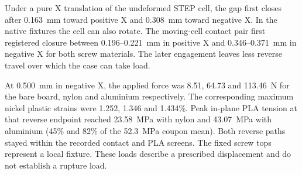 Under a pure X translation of the undeformed STEP cell, the gap first closes after 0.163~mm toward positive X and 0.308~mm toward negative X. In the native fixtures the cell can also rotate. The moving-cell contact pair first registered closure between 0.196--0.221~mm in positive X and 0.346--0.371~mm in negative X for both screw materials. The later engagement leaves less reverse travel over which the case can take load.

At 0.500~mm in negative X, the applied force was 8.51, 64.73 and 113.46~N for the bare board, nylon and aluminium respectively. The corresponding maximum nickel plastic strains were 1.252, 1.346 and 1.434\%. Peak in-plane PLA tension at that reverse endpoint reached 23.58~MPa with nylon and 43.07~MPa with aluminium (45\% and 82\% of the 52.3~MPa coupon mean). Both reverse paths stayed within the recorded contact and PLA screens. The fixed screw tops represent a local fixture. These loads describe a prescribed displacement and do not establish a rupture load.
